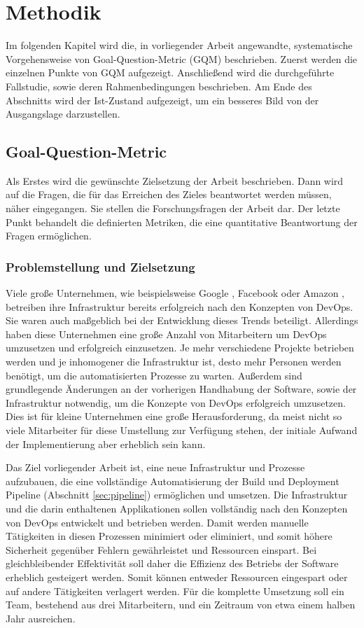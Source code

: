 \chapter{Methodik}
\label{sec:methodik}
Im folgenden Kapitel wird die, in vorliegender Arbeit angewandte, systematische Vorgehensweise von Goal-Question-Metric (GQM) beschrieben. Zuerst werden die einzelnen Punkte von GQM aufgezeigt. Anschließend wird die durchgeführte Fallstudie, sowie deren Rahmenbedingungen beschrieben. Am Ende des Abschnitts wird der Ist-Zustand aufgezeigt, um ein besseres Bild von der Ausgangslage darzustellen.

\section{Goal-Question-Metric}
\label{sec:goalquestionmetric}
Als Erstes wird die gewünschte Zielsetzung der Arbeit beschrieben. Dann wird auf die Fragen, die für das Erreichen des Zieles beantwortet werden müssen, näher eingegangen. Sie stellen die Forschungsfragen der Arbeit dar. Der letzte Punkt behandelt die definierten Metriken, die eine quantitative Beantwortung der Fragen ermöglichen.

\subsection{Problemstellung und Zielsetzung}
\label{sec:ziel}
Viele große Unternehmen, wie beispielsweise Google \cite{kim2014, meckfessel2014}, Facebook \cite{feitelson2013} oder Amazon \cite{lawton2013}, betreiben ihre Infrastruktur bereits erfolgreich nach den Konzepten von DevOps. Sie waren auch maßgeblich bei der Entwicklung dieses Trends beteiligt. Allerdings haben diese Unternehmen eine große Anzahl von Mitarbeitern um DevOps umzusetzen und erfolgreich einzusetzen. Je mehr verschiedene Projekte betrieben werden und je inhomogener die Infrastruktur ist, desto mehr Personen werden benötigt, um die automatisierten Prozesse zu warten. Außerdem sind grundlegende Änderungen an der vorherigen Handhabung der Software, sowie der Infrastruktur notwendig, um die Konzepte von DevOps erfolgreich umzusetzen. Dies ist für kleine Unternehmen eine große Herausforderung, da meist nicht so viele Mitarbeiter für diese Umstellung zur Verfügung stehen, der initiale Aufwand der Implementierung aber erheblich sein kann. 

Das Ziel vorliegender Arbeit ist, eine neue Infrastruktur und Prozesse aufzubauen, die eine vollständige Automatisierung der Build und Deployment Pipeline (Abschnitt \ref{sec:pipeline}) ermöglichen und umsetzen. Die Infrastruktur und die darin enthaltenen Applikationen sollen vollständig nach den Konzepten von DevOps entwickelt und betrieben werden. Damit werden manuelle Tätigkeiten in diesen Prozessen minimiert oder eliminiert, und somit höhere Sicherheit gegenüber Fehlern gewährleistet und Ressourcen einspart. Bei gleichbleibender Effektivität soll daher die Effizienz des Betriebs der Software erheblich gesteigert werden. Somit können entweder Ressourcen eingespart oder auf andere Tätigkeiten verlagert werden. Für die komplette Umsetzung soll ein Team, bestehend aus drei Mitarbeitern, und ein Zeitraum von etwa einem halben Jahr ausreichen.


